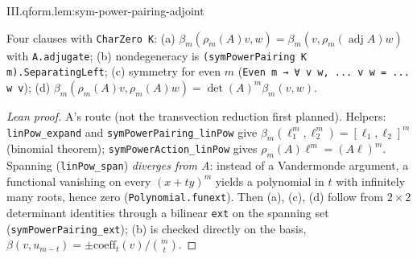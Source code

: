 \begin{lemma}
\end{lemma}
\begin{tfformal}{III.qform.lem:sym-power-pairing-adjoint}
\begin{tffidelity}
Four clauses with \texttt{CharZero K}: (a) $\beta_m(\rho_m(A)v,w)=\beta_m(v,\rho_m(\operatorname{adj}A)w)$ with \texttt{A.adjugate}; (b) nondegeneracy is \texttt{(symPowerPairing K m).SeparatingLeft}; (c) symmetry for even $m$ (\texttt{Even m → ∀ v w, ... v w = ... w v}); (d) $\beta_m(\rho_m(A)v,\rho_m(A)w)=\det(A)^m\beta_m(v,w)$.
\end{tffidelity}
\end{tfformal}
\begin{proof}[Lean proof]
A's route (not the transvection reduction first planned). Helpers: \texttt{linPow\_expand} and \texttt{symPowerPairing\_linPow} give $\beta_m(\ell_1^m,\ell_2^m)=[\ell_1,\ell_2]^m$ (binomial theorem); \texttt{symPowerAction\_linPow} gives $\rho_m(A)\ell^m=(A\ell)^m$. Spanning (\texttt{linPow\_span}) \emph{diverges from A}: instead of a Vandermonde argument, a functional vanishing on every $(x+ty)^m$ yields a polynomial in $t$ with infinitely many roots, hence zero (\texttt{Polynomial.funext}). Then (a), (c), (d) follow from $2\times2$ determinant identities through a bilinear \texttt{ext} on the spanning set (\texttt{symPowerPairing\_ext}); (b) is checked directly on the basis, $\beta(v,u_{m-t})=\pm\mathrm{coeff}_t(v)/\binom mt$.
\end{proof}

